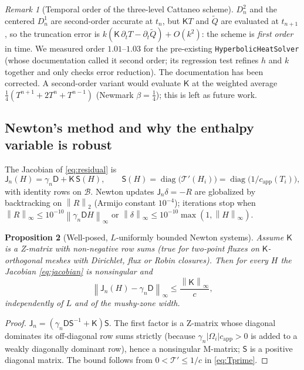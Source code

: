 \documentclass[11pt]{article}
\numberwithin{equation}{section}
\newtheorem{proposition}{Proposition}[section]
\theoremstyle{remark}
\newtheorem{remark}[proposition]{Remark}
\newcommand{\norm}[1]{\left\lVert #1 \right\rVert}
\newcommand{\Dm}{\mathsf{D}}           %
\newcommand{\K}{\mathsf{K}}
\newcommand{\capp}{c_{\mathrm{app}}}
\begin{document}
\begin{remark}[Temporal order of the three-level Cattaneo scheme]
\label{rem:order}
$D^2_n$ and the centered $D^1_n$ are second-order accurate at $t_n$, but
$\K T$ and $\tilde Q$ are evaluated at $t_{n+1}$, so the truncation error is
$k(\K\,\partial_tT-\partial_t\tilde Q)+O(k^2)$: the scheme is \emph{first order}
in time.  We measured order $1.01$--$1.03$ for the pre-existing
\texttt{HyperbolicHeatSolver} (whose documentation called it second order; its
regression test refines $h$ and $k$ together and only checks error reduction).
The documentation has been corrected.  A second-order variant would evaluate
$\K$ at the weighted average $\frac14(T^{n+1}+2T^n+T^{n-1})$ (Newmark
$\beta=\frac14$); this is left as future work.
\end{remark}

\subsection{Newton's method and why the enthalpy variable is robust}

The Jacobian of \eqref{eq:residual} is
\begin{equation}
  \mathsf J_n(H) = \gamma_n\Dm + \K\,\mathsf S(H), \qquad
  \mathsf S(H)=\operatorname{diag}\big(\mathcal T'(H_i)\big)
  =\operatorname{diag}\big(1/\capp(T_i)\big),
  \label{eq:jacobian}
\end{equation}
with identity rows on $\mathcal B$.  Newton updates
$\mathsf J_n\delta=-R$ are globalized by backtracking on $\norm{R}_2$
(Armijo constant $10^{-4}$); iterations stop when
$\norm{R}_\infty\le 10^{-10}\norm{\gamma_n\Dm H}_\infty$ or
$\norm{\delta}_\infty\le10^{-10}\max(1,\norm{H}_\infty)$.

\begin{proposition}[Well-posed, $L$-uniformly bounded Newton systems]
Assume $\K$ is a Z-matrix with non-negative row sums (true for two-point
fluxes on $\K$-orthogonal meshes with Dirichlet, flux or Robin closures).
Then for every $H$ the Jacobian \eqref{eq:jacobian} is nonsingular and
\begin{equation}
  \norm{\mathsf J_n(H)-\gamma_n\Dm}_\infty \le \frac{\norm{\K}_\infty}{c},
  \label{eq:bounded}
\end{equation}
independently of $L$ and of the mushy-zone width.
\end{proposition}
\begin{proof}
$\mathsf J_n=(\gamma_n\Dm\mathsf S^{-1}+\K)\mathsf S$.  The first factor is a
Z-matrix whose diagonal dominates its off-diagonal row sums strictly (because
$\gamma_n|\Omega_i|\capp>0$ is added to a weakly diagonally dominant row), hence a
nonsingular M-matrix; $\mathsf S$ is a positive diagonal matrix.  The bound
follows from $0<\mathcal T'\le 1/c$ in \eqref{eq:Tprime}.
\end{proof}
\end{document}

